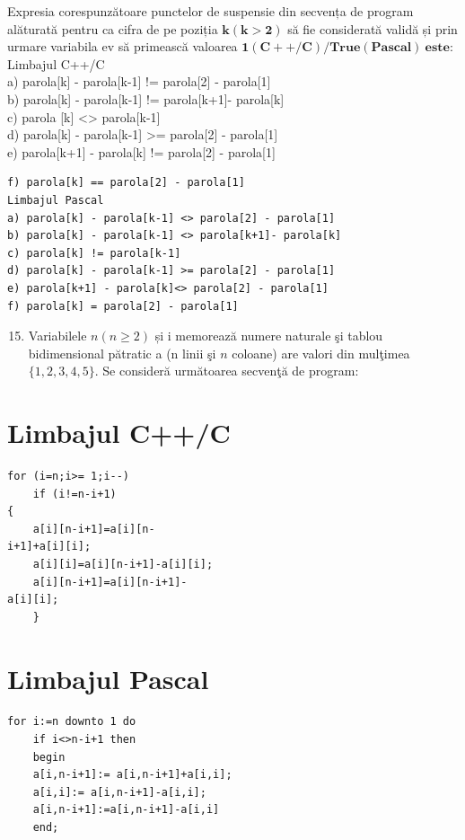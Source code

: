 \documentclass[10pt]{article}
\begin{document}
Expresia corespunzătoare punctelor de suspensie din secvența de program alăturată pentru ca cifra de pe poziția $\mathbf{k}(\mathbf{k}>\mathbf{2})$ să fie considerată validă și prin urmare variabila ev să primească valoarea $\mathbf{1 ( C + + / C ) / T r u e ( P a s c a l ) ~ e s t e : ~}$\\
Limbajul C++/C\\[0pt]
a) parola[k] - parola[k-1] != parola[2] - parola[1]\\[0pt]
b) parola[k] - parola[k-1] != parola[k+1]- parola[k]\\[0pt]
c) parola [k] <> parola[k-1]\\[0pt]
d) parola[k] - parola[k-1] >= parola[2] - parola[1]\\[0pt]
e) parola[k+1] - parola[k] != parola[2] - parola[1]

\begin{verbatim}
f) parola[k] == parola[2] - parola[1]
Limbajul Pascal
a) parola[k] - parola[k-1] <> parola[2] - parola[1]
b) parola[k] - parola[k-1] <> parola[k+1]- parola[k]
c) parola[k] != parola[k-1]
d) parola[k] - parola[k-1] >= parola[2] - parola[1]
e) parola[k+1] - parola[k]<> parola[2] - parola[1]
f) parola[k] = parola[2] - parola[1]
\end{verbatim}

\begin{enumerate}
  \setcounter{enumi}{14}
  \item Variabilele $n(n \geq 2)$ și i memorează numere naturale şi tablou bidimensional pătratic a (n linii şi $n$ coloane) are valori din mulţimea $\{1,2,3,4,5\}$. Se consideră următoarea secvenţă de program:
\end{enumerate}

\section*{Limbajul C++/C}
\begin{verbatim}
for (i=n;i>= 1;i--)
    if (i!=n-i+1)
{
    a[i][n-i+1]=a[i][n-
i+1]+a[i][i];
    a[i][i]=a[i][n-i+1]-a[i][i];
    a[i][n-i+1]=a[i][n-i+1]-
a[i][i];
    }
\end{verbatim}

\section*{Limbajul Pascal}
\begin{verbatim}
for i:=n downto 1 do
    if i<>n-i+1 then
    begin
    a[i,n-i+1]:= a[i,n-i+1]+a[i,i];
    a[i,i]:= a[i,n-i+1]-a[i,i];
    a[i,n-i+1]:=a[i,n-i+1]-a[i,i]
    end;
\end{verbatim}
\end{document}
